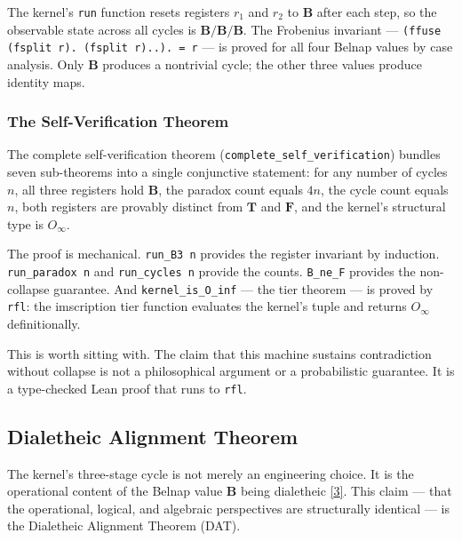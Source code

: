 \documentclass[10pt,a4paper]{article}
\begin{document}
The kernel's \texttt{run} function resets registers $r_1$ and $r_2$ to $\mathbf{B}$ after each step, so the observable state across all cycles is $\mathbf{B}/\mathbf{B}/\mathbf{B}$. The Frobenius invariant --- \texttt{(ffuse (fsplit r). (fsplit r)..). = r} --- is proved for all four Belnap values by case analysis. Only $\mathbf{B}$ produces a nontrivial cycle; the other three values produce identity maps.

\subsubsection{The Self-Verification Theorem}

The complete self-verification theorem (\texttt{complete\_\allowbreak self\_\allowbreak verification}) bundles seven sub-theorems into a single conjunctive statement: for any number of cycles $n$, all three registers hold $\mathbf{B}$, the paradox count equals $4n$, the cycle count equals $n$, both registers are provably distinct from $\mathbf{T}$ and $\mathbf{F}$, and the kernel's structural type is $O_{\infty}$.

The proof is mechanical. \texttt{run\_\allowbreak B3 n} provides the register invariant by induction. \texttt{run\_\allowbreak paradox n} and \texttt{run\_\allowbreak cycles n} provide the counts. \texttt{B\_\allowbreak ne\_\allowbreak F} provides the non-collapse guarantee. And \texttt{kernel\_\allowbreak is\_\allowbreak O\_\allowbreak inf} --- the tier theorem --- is proved by \texttt{rfl}: the imscription tier function evaluates the kernel's tuple and returns $O_{\infty}$ definitionally.

This is worth sitting with. The claim that this machine sustains contradiction without collapse is not a philosophical argument or a probabilistic guarantee. It is a type-checked Lean proof that runs to \texttt{rfl}.

\subsection{Dialetheic Alignment Theorem}

The kernel's three-stage cycle is not merely an engineering choice. It is the operational content of the Belnap value $\mathbf{B}$ being dialetheic \href{}{{[}3{]}}. This claim --- that the operational, logical, and algebraic perspectives are structurally identical --- is the Dialetheic Alignment Theorem (DAT).
\end{document}
